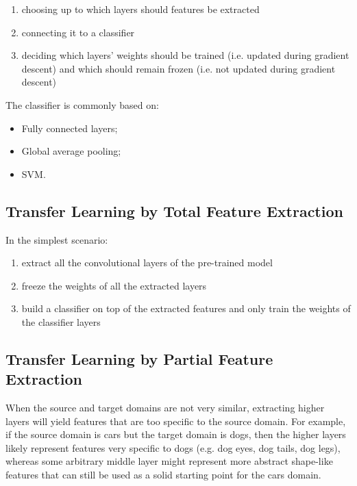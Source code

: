 \begin{enumerate}
    \item choosing up to which layers should features be extracted
    \item connecting it to a classifier
    \item deciding which layers' weights should be trained (i.e. updated during gradient descent) and which should remain frozen (i.e. not updated during gradient descent)
\end{enumerate}

The classifier is commonly based on:

\begin{itemize}
    \item Fully connected layers;
    \item Global average pooling;
    \item SVM.
\end{itemize}

\subsection{Transfer Learning by Total Feature Extraction}

In the simplest scenario:

\begin{enumerate}
    \item extract all the convolutional layers of the pre-trained model
    \item freeze the weights of all the extracted layers
    \item build a classifier on top of the extracted features and only train the weights of the classifier layers
\end{enumerate}

\subsection{Transfer Learning by Partial Feature Extraction}

When the source and target domains are not very similar, extracting higher layers will yield features that are too specific to the source domain. For example, if the source domain is cars but the target domain is dogs, then the higher layers likely represent features very specific to dogs (e.g. dog eyes, dog tails, dog legs), whereas some arbitrary middle layer might represent more abstract shape-like features that can still be used as a solid starting point for the cars domain.

